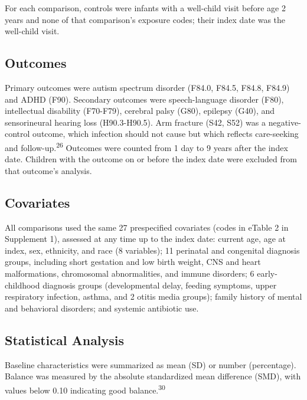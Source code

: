 \documentclass[11pt]{article}
\begin{document}
For each comparison, controls were infants with a well-child visit before age 2 years and none of that comparison's exposure codes; their index date was the well-child visit.

\hypertarget{outcomes}{%
\subsection*{Outcomes}\label{outcomes}}

Primary outcomes were autism spectrum disorder (F84.0, F84.5, F84.8, F84.9) and ADHD (F90). Secondary outcomes were speech-language disorder (F80), intellectual disability (F70-F79), cerebral palsy
(G80), epilepsy (G40), and sensorineural hearing loss (H90.3-H90.5). Arm fracture (S42, S52) was a negative-control outcome, which infection should not cause but which reflects care-seeking and
follow-up.\textsuperscript{26} Outcomes were counted from 1 day to 9 years after the index date. Children with the outcome on or before the index date were excluded from that outcome's analysis.

\hypertarget{covariates}{%
\subsection*{Covariates}\label{covariates}}

All comparisons used the same 27 prespecified covariates (codes in eTable 2 in Supplement 1), assessed at any time up to the index date: current age, age at index, sex, ethnicity, and race (8
variables); 11 perinatal and congenital diagnosis groups, including short gestation and low birth weight, CNS and heart malformations, chromosomal abnormalities, and immune disorders; 6
early-childhood diagnosis groups (developmental delay, feeding symptoms, upper respiratory infection, asthma, and 2 otitis media groups); family history of mental and behavioral disorders; and
systemic antibiotic use.

\hypertarget{statistical-analysis}{%
\subsection*{Statistical Analysis}\label{statistical-analysis}}

Baseline characteristics were summarized as mean (SD) or number (percentage). Balance was measured by the absolute standardized mean difference (SMD), with values below 0.10 indicating good
balance.\textsuperscript{30}
\end{document}
